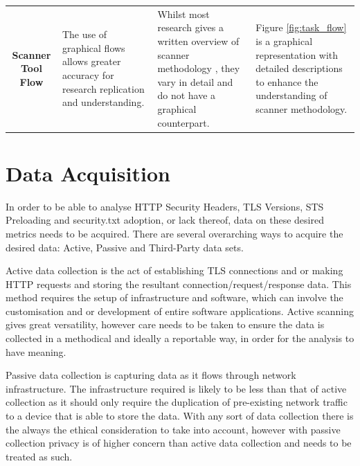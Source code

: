\documentclass{mscreport}
\begin{document}
\begin{center}
\begin{longtable}{|C|E|H|H|}
      \hline
      \textbf{Scanner Tool Flow} & The use of graphical flows allows greater accuracy for research replication and understanding. & Whilst most research gives a written overview of scanner methodology \cite{Buchanan2018-xz,Amann2017-co,Patil2017-bg,Kotzias2018-wd,Poteat2021-zr,Van_Goethem2014-ao,Chen2016-dl,Kumar2017-qw,Holz2020-ha,Michael2015-hn}, they vary in detail and do not have a graphical counterpart. & Figure \ref{fig:task_flow} is a graphical representation with detailed descriptions to enhance the understanding of scanner methodology. \\
\end{longtable}
\end{center}

\newpage

\section{Data Acquisition}
\label{section:data_aquisition}

In order to be able to analyse HTTP Security Headers, TLS Versions, STS Preloading and security.txt adoption, or lack thereof, data on these desired metrics needs to be acquired. There are several overarching ways to acquire the desired data: Active, Passive and Third-Party data sets.

\vspace{0.3cm} \noindent
Active data collection is the act of establishing TLS connections and or making HTTP requests and storing the resultant connection/request/response data. This method requires the setup of infrastructure and software, which can involve the customisation and or development of entire software applications. Active scanning gives great versatility, however care needs to be taken to ensure the data is collected in a methodical and ideally a reportable way, in order for the analysis to have meaning.

\vspace{0.3cm} \noindent
Passive data collection is capturing data as it flows through network infrastructure. The infrastructure required is likely to be less than that of active collection as it should only require the duplication of pre-existing network traffic to a device that is able to store the data. With any sort of data collection there is the always the ethical consideration to take into account, however with passive collection privacy is of higher concern than active data collection and needs to be treated as such.
\end{document}

